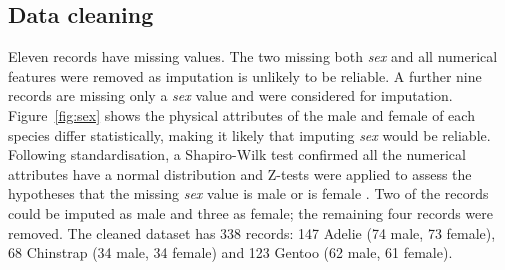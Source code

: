 \documentclass[a4paper, 11pt]{article}
\begin{document}
\vspace{\baselineskip}
\subsection*{Data cleaning}

Eleven records have missing values. 
The two missing both \textit{sex} and all numerical features were removed as imputation is unlikely to be reliable. 
A further nine records are missing only a \textit{sex} value and were considered for imputation. 
Figure~\ref{fig:sex} shows the physical 
attributes of the male and female of each species differ statistically, making it likely that imputing \textit{sex} would be reliable. Following standardisation, 
a Shapiro-Wilk test confirmed all the numerical attributes have a normal distribution \cite{shapiro1965analysis} 
and Z-tests were applied to assess the 
hypotheses that the missing \textit{sex} value is male or is female \cite{freedman2007statistics}. 
Two of the records could be imputed as male and three as female; the 
remaining four records were removed. 
The cleaned dataset has 338 records: 147 Adelie  
(74 male, 73 female), 68 Chinstrap (34 male, 34 female) and 123 Gentoo (62 male, 61 female).
\end{document}

